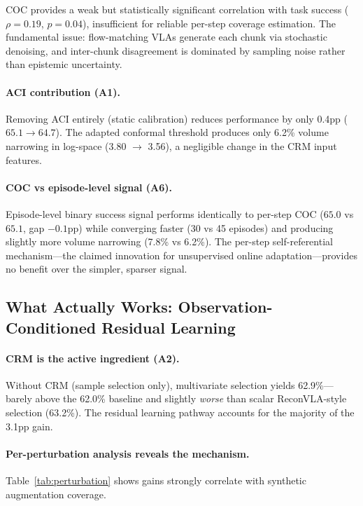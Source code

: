 \documentclass[letterpaper]{article}
\begin{document}
COC provides a weak but statistically significant correlation with task success ($\rho = 0.19$, $p = 0.04$), insufficient for reliable per-step coverage estimation.
The fundamental issue: flow-matching VLAs generate each chunk via stochastic denoising, and inter-chunk disagreement is dominated by sampling noise rather than epistemic uncertainty.

\paragraph{ACI contribution (A1).}
Removing ACI entirely (static calibration) reduces performance by only 0.4pp ($65.1 \to 64.7$).
The adapted conformal threshold produces only 6.2\% volume narrowing in log-space (3.80 $\to$ 3.56), a negligible change in the CRM input features.

\paragraph{COC vs episode-level signal (A6).}
Episode-level binary success signal performs identically to per-step COC ($65.0$ vs $65.1$, gap $-0.1$pp) while converging faster (30 vs 45 episodes) and producing slightly more volume narrowing (7.8\% vs 6.2\%).
The per-step self-referential mechanism---the claimed innovation for unsupervised online adaptation---provides no benefit over the simpler, sparser signal.

\subsection{What Actually Works: Observation-Conditioned Residual Learning}

\paragraph{CRM is the active ingredient (A2).}
Without CRM (sample selection only), multivariate selection yields 62.9\%---barely above the 62.0\% baseline and slightly \emph{worse} than scalar ReconVLA-style selection (63.2\%).
The residual learning pathway accounts for the majority of the 3.1pp gain.

\paragraph{Per-perturbation analysis reveals the mechanism.}
Table~\ref{tab:perturbation} shows gains strongly correlate with synthetic augmentation coverage.
\end{document}
